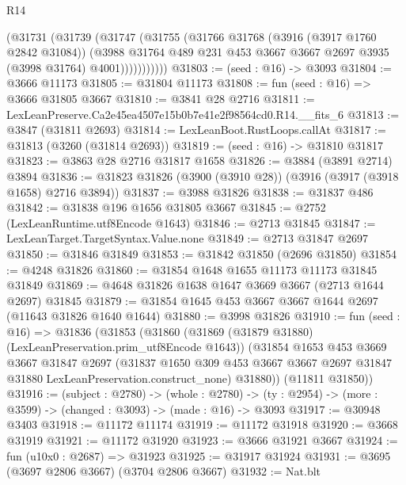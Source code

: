 \begin{lexlean}{R14}
\begin{coremodule}
              (@31731
                (@31739
                  (@31747
                    (@31755
                      (@31766
                        @31768
                        (@3916 (@3917 @1760 @2842 @31084))
                        (@3988
                          @31764
                          @489
                          @231
                          @453
                          @3667
                          @3667
                          @2697
                          @3935
                          (@3998 @31764)
                          @4001)))))))))))
@31803 := (seed : @16) -> @3093
@31804 := @3666 @11173
@31805 := @31804 @11173
@31808 := fun (seed : @16) => @3666 @31805 @3667
@31810 := @3841 @28 @2716
@31811 := LexLeanPreserve.Ca2e45ea4507e15b0b7e41e2f98564cd0.R14.__fits_6
@31813 := @3847 (@31811 @2693)
@31814 := LexLeanBoot.RustLoops.callAt
@31817 := @31813 (@3260 (@31814 @2693))
@31819 := (seed : @16) -> @31810 @31817
@31823 := @3863 @28 @2716 @31817 @1658
@31826 := @3884 (@3891 @2714) @3894
@31836 := @31823 @31826 (@3900 (@3910 @28)) (@3916 (@3917 (@3918 @1658) @2716 @3894))
@31837 := @3988 @31826
@31838 := @31837 @486
@31842 := @31838 @196 @1656 @31805 @3667
@31845 := @2752 (LexLeanRuntime.utf8Encode @1643)
@31846 := @2713 @31845
@31847 := LexLeanTarget.TargetSyntax.Value.none
@31849 := @2713 @31847 @2697
@31850 := @31846 @31849
@31853 := @31842 @31850 (@2696 @31850)
@31854 := @4248 @31826
@31860 := @31854 @1648 @1655 @11173 @11173 @31845 @31849
@31869 := @4648 @31826 @1638 @1647 @3669 @3667 (@2713 @1644 @2697) @31845
@31879 := @31854 @1645 @453 @3667 @3667 @1644 @2697 (@11643 @31826 @1640 @1644)
@31880 := @3998 @31826
@31910 := fun (seed : @16) =>
  @31836
    (@31853
      (@31860
        (@31869 (@31879 @31880) (LexLeanPreservation.prim_utf8Encode @1643))
        (@31854
          @1653
          @453
          @3669
          @3667
          @31847
          @2697
          (@31837
            @1650
            @309
            @453
            @3667
            @3667
            @2697
            @31847
            @31880
            LexLeanPreservation.construct_none)
          @31880))
      (@11811 @31850))
@31916 := (subject : @2780) ->
  (whole : @2780) -> (ty : @2954) -> (more : @3599) -> (changed : @3093) -> (made : @16) -> @3093
@31917 := @30948 @3403
@31918 := @11172 @11174
@31919 := @11172 @31918
@31920 := @3668 @31919
@31921 := @11172 @31920
@31923 := @3666 @31921 @3667
@31924 := fun (u10x0 : @2687) => @31923
@31925 := @31917 @31924
@31931 := @3695 (@3697 @2806 @3667) (@3704 @2806 @3667)
@31932 := Nat.blt

\end{coremodule}
\end{lexlean}
